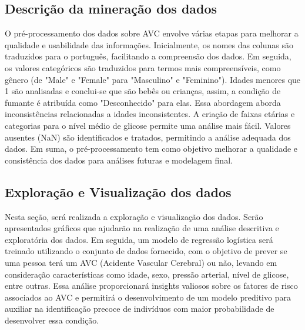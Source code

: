 \documentclass[conference]{IEEEtran}
\begin{document}
  \subsection{Descrição da mineração dos dados}
  \label{AA}
O pré-processamento dos dados sobre AVC envolve várias etapas para melhorar a qualidade e usabilidade das informações. Inicialmente, os nomes das colunas são traduzidos para o português, facilitando a compreensão dos dados. Em seguida, os valores categóricos são traduzidos para termos mais compreensíveis, como gênero (de "Male" e "Female" para "Masculino" e "Feminino"). Idades menores que 1 são analisadas e conclui-se que são bebês ou crianças, assim, a condição de fumante é atribuída como "Desconhecido" para elas. Essa abordagem aborda inconsistências relacionadas a idades inconsistentes. A criação de faixas etárias e categorias para o nível médio de glicose permite uma análise mais fácil. Valores ausentes (NaN) são identificados e tratados, permitindo a análise adequada dos dados. Em suma, o pré-processamento tem como objetivo melhorar a qualidade e consistência dos dados para análises futuras e modelagem final. 


  \subsection{Exploração e Visualização dos dados}
  \label{AA}
Nesta seção, será realizada a exploração e visualização dos dados. Serão apresentados gráficos que ajudarão na realização de uma análise descritiva e exploratória dos dados. Em seguida, um modelo de regressão logística será treinado utilizando o conjunto de dados fornecido, com o objetivo de prever se uma pessoa terá um AVC (Acidente Vascular Cerebral) ou não, levando em consideração características como idade, sexo, pressão arterial, nível de glicose, entre outras. Essa análise proporcionará insights valiosos sobre os fatores de risco associados ao AVC e permitirá o desenvolvimento de um modelo preditivo para auxiliar na identificação precoce de indivíduos com maior probabilidade de desenvolver essa condição.
  
\end{document}
